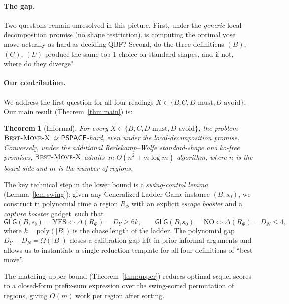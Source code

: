\documentclass[11pt,a4paper]{amsart}
\newtheorem*{theorem*}{Theorem}
\theoremstyle{definition}
\theoremstyle{remark}
\newcommand{\PSPACE}{\mathsf{PSPACE}}
\newcommand{\GLG}{\mathsf{GLG}}
\newcommand{\BMX}{\textsc{Best-Move-X}}
\begin{document}
\paragraph{The gap.}
Two questions remain unresolved in this picture. First, under the
\emph{generic} local-decomposition promise (no shape restriction), is
computing the optimal yose move actually as hard as deciding QBF? Second,
do the three definitions $(B)$, $(C)$, $(D)$ produce the same
top-$1$ choice on standard shapes, and if not, where do they diverge?

\paragraph{Our contribution.}
We address the first question for all four readings
$X \in \{B, C, D\text{-must}, D\text{-avoid}\}$. Our main result
(Theorem~\ref{thm:main}) is:

\begin{theorem*}[Informal]
For every $X \in \{B, C, D\text{-must}, D\text{-avoid}\}$, the problem
$\BMX$ is $\PSPACE$-hard, even under the local-decomposition promise.
Conversely, under the additional Berlekamp--Wolfe standard-shape and
ko-free promises, $\BMX$ admits an $O(n^2 + m \log m)$ algorithm,
where $n$ is the board side and $m$ is the number of regions.
\end{theorem*}

The key technical step in the lower bound is a \emph{swing-control lemma}
(Lemma~\ref{lem:swing}): given any Generalized Ladder Game instance
$(B, s_0)$, we construct in polynomial time a region $R_\Phi$ with an
explicit \emph{escape booster} and a \emph{capture booster} gadget, such that
\[
  \GLG(B, s_0) = \mathrm{YES}
  \Longleftrightarrow
  \Delta(R_\Phi) = D_Y \geq 6k,
  \qquad
  \GLG(B, s_0) = \mathrm{NO}
  \Longleftrightarrow
  \Delta(R_\Phi) = D_N \leq 4,
\]
where $k = \mathrm{poly}(|B|)$ is the chase length of the ladder. The
polynomial gap $D_Y - D_N = \Omega(|B|)$ closes a calibration gap left in
prior informal arguments and allows us to instantiate a single reduction
template for all four definitions of ``best move''.

The matching upper bound (Theorem~\ref{thm:upper}) reduces optimal-sequel
scores to a closed-form prefix-sum expression over the swing-sorted
permutation of regions, giving $O(m)$ work per region after sorting.
\end{document}
